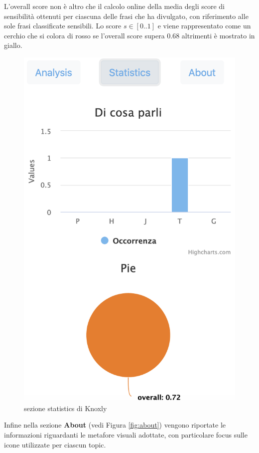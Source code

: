 L'overall score non è altro che il calcolo online della media degli score di sensibilità ottenuti per ciascuna delle frasi che ha divulgato, con riferimento alle sole frasi classificate sensibili. Lo score $s \in [0..1]$ e viene rappresentato come un cerchio che si colora di rosso se l'overall score supera 0.68 altrimenti è mostrato in giallo. 
\begin{figure}[h]
    \centering
    \includegraphics[scale=0.7]{Figure/ui/statistics.png}
    \caption{sezione statistics di Knoxly}
    \label{fig:statKnoxly}
\end{figure}
\FloatBarrier

Infine nella sezione \textbf{About} (vedi Figura \ref{fig:about}) vengono riportate le informazioni riguardanti le metafore visuali adottate, con particolare focus sulle icone utilizzate per ciascun topic.

